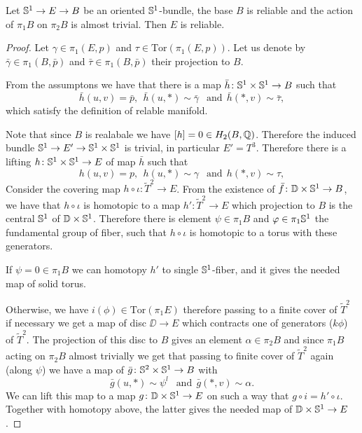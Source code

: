 \documentclass{amsart}
\begin{document}
\begin{claim}
 Let ${\Bbb S}^1\to E\to B$ be an oriented ${\Bbb S}^1$-bundle, the base  $B$ is reliable and the action of $\pi_1B$ on $\pi_2B$ is almost trivial. 
Then $E$ is reliable.
\end{claim}

\begin{proof}
Let $\gamma\in \pi_1(E,p)$ and $\tau\in \mathrm{Tor}(\pi_1(E,p))$. 
Let us denote by $\bar\gamma\in \pi_1(B,\bar p)$ and 
$\bar\tau\in \pi_1(B,\bar p)$ their projection to $B$.

From the assumptons we have 
that there is a map 
$\bar h\colon {\Bbb S}^1\times {\Bbb S}^1\to B$ such that 
$$\bar h(u,v)=\bar p,\ \ 
\bar h(u,*)\sim\bar\gamma\ \ \text{ and}\ \ 
\bar h(*,v)\sim\bar\tau,$$
which satisfy the definition of relable manifold.

Note that since $B$ is realabale we have $[h]=0\in H_2(B,{\Bbb Q})$. Therefore the induced bundle ${\Bbb S}^1\to E'\to {\Bbb S}^1\times {\Bbb S}^1$ is trivial, in particular $E'=T^3$.
Therefore there is a lifting $h\colon {\Bbb S}^1\times {\Bbb S}^1\to E$ of map $\bar h$ such that
$$ h(u,v)= p,\ \ 
 h(u,*)\sim\gamma\ \ \text{ and}\ \ 
 h(*,v)\sim\tau,$$
Consider the covering map $h\circ\iota\colon \tilde T^2\to E$.
From the existence of 
$\bar f\colon \DD\times {\Bbb S}^1\to B$, 
we have that $h\circ\iota$ is homotopic to a map
$h'\colon \tilde T^2\to E$ which projection to $B$ is the central ${\Bbb S}^1$ of 
$\DD\times {\Bbb S}^1$. 
Therefore there is element $\psi\in\pi_1B$ and $\phi\in\pi_1{\Bbb S}^1$ the fundamental group of fiber, such that $h\circ\iota$ is homotopic to a torus with these generators.

If $\psi=0\in \pi_1B$ we can homotopy $h'$ to single ${\Bbb S}^1$-fiber, and it gives the needed map of solid torus.

Otherwise, we have $i(\phi)\in \mathrm{Tor}(\pi_1E)$ 
therefore passing to a finite cover of $\tilde T^2$ 
if necessary we get a map of
disc $\DD\to E$ which contracts one of generators ($k \phi$) of $\tilde T^2$.
The projection of this disc to $B$ gives an element $\alpha\in \pi_2B$ 
and since $\pi_1B$ acting on $\pi_2B$ almost trivially we get 
that passing to finite cover of $\tilde T^2$ again (along $\psi$) we have a map of $\bar g\colon {\Bbb S}^2\times {\Bbb S}^1\to B$ with
$$ 
 \bar g(u,*)\sim\psi^l\ \ \text{ and}\ \ 
 \bar g(*,v)\sim\alpha.$$
We can lift this map to a map $g\colon \DD\times {\Bbb S}^1\to E$ on such a way that $g\circ i=h'\circ \iota$. 
Together with homotopy above, the latter gives the needed map of 
$\DD\times {\Bbb S}^1\to E$.
\end{proof}
\end{document}
